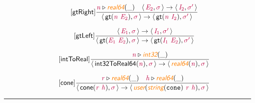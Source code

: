 \documentclass[10pt,leqno,fleqn]{article}
\newcommand{\artVariable}[1]{\mbox{\color{purple}\em #1\/}}
\newcommand{\artConstructor}[1]{\mbox{\sf #1}}
\newcommand{\artCaseInsensitiveLiteral}[1]{\mbox{\tt #1}}
\newcommand{\artSpecial}[1]{\mbox{\color{orange}\sf\em #1}}
\begin{document}
\begin{equation}
\tag*{[\artConstructor{\sf gtRight}]}
\begin{split}\frac{ \artVariable{n}\triangleright \artSpecial{real64}(\_) \quad \langle\, \artVariable{E$_{2}$}, \artVariable{$\sigma$}\,\rangle \rightarrow \langle\, \artVariable{I$_{2}$}, \artVariable{$\sigma$\/$^\prime$}\,\rangle }{\langle\, \artConstructor{\sf gt}(\artVariable{n}\ \artVariable{E$_{2}$}), \artVariable{$\sigma$}\,\rangle \rightarrow \langle\, \artConstructor{\sf gt}(\artVariable{n}\ \artVariable{I$_{2}$}), \artVariable{$\sigma$\/$^\prime$}\,\rangle }
\end{split}
\end{equation}

\begin{equation}
\tag*{[\artConstructor{\sf gtLeft}]}
\begin{split}\frac{\langle\, \artVariable{E$_{1}$}, \artVariable{$\sigma$}\,\rangle \rightarrow \langle\, \artVariable{I$_{1}$}, \artVariable{$\sigma$\/$^\prime$}\,\rangle }{\langle\, \artConstructor{\sf gt}(\artVariable{E$_{1}$}\ \artVariable{E$_{2}$}), \artVariable{$\sigma$}\,\rangle \rightarrow \langle\, \artConstructor{\sf gt}(\artVariable{I$_{1}$}\ \artVariable{E$_{2}$}), \artVariable{$\sigma$\/$^\prime$}\,\rangle }
\end{split}
\end{equation}

\begin{equation}
\tag*{[\artConstructor{\sf intToReal}]}
\begin{split}\frac{ \artVariable{n}\triangleright \artSpecial{int32}(\_) }{\langle\, \artConstructor{\sf int32ToReal64}(\artVariable{n}), \artVariable{$\sigma$}\,\rangle \rightarrow \langle\, \artSpecial{real64}(\artVariable{n}), \artVariable{$\sigma$}\,\rangle }
\end{split}
\end{equation}

\begin{equation}
\tag*{[\artConstructor{\sf cone}]}
\begin{split}\frac{ \artVariable{r}\triangleright \artSpecial{real64}(\_) \quad  \artVariable{h}\triangleright \artSpecial{real64}(\_) }{\langle\, \artConstructor{\sf cone}(\artVariable{r}\ \artVariable{h}), \artVariable{$\sigma$}\,\rangle \rightarrow \langle\, \artSpecial{user}(\artSpecial{string}(\artCaseInsensitiveLiteral{cone})\ \artVariable{r}\ \artVariable{h}), \artVariable{$\sigma$}\,\rangle }
\end{split}
\end{equation}

\hrule
\end{document}
